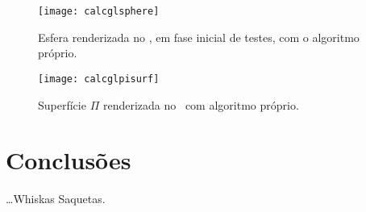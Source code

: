 \begin{figure}[!htbp]
	\centering
	\texttt{[image: calcglsphere]}
	\caption[Esfera no \theapp~com algoritmo próprio]{Esfera renderizada no \theapp, em fase inicial de testes, com o algoritmo próprio.}
	\label{fig::calcglsphere}
\end{figure}

\begin{figure}[!htbp]
	\centering
	\texttt{[image: calcglpisurf]}
	\caption[Superfície $\Pi$ no \theapp~com algoritmo próprio]{Superfície $\Pi$ renderizada no \theapp~com algoritmo próprio.}
	\label{fig::calcglpisurf}
\end{figure}


\section{Conclusões}
\label{sec::testes:conc}

\ldots Whiskas Saquetas.
